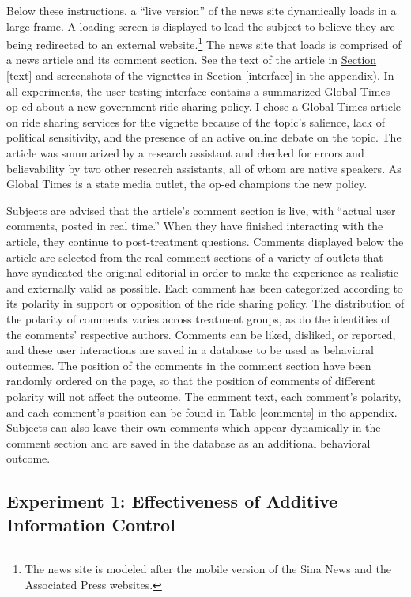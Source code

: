 \documentclass[11pt]{article}
\begin{document}
Below these instructions, a ``live version'' of the news site dynamically loads in a large frame. A loading screen is displayed to lead the subject to believe they are being redirected to an external website.\footnote{The news site is modeled after the mobile version of the Sina News and the Associated Press websites.} The news site that loads is comprised of a news article and its comment section. See the text of the article in \hyperref[text]{Section \ref*{text}} and screenshots of the vignettes in \hyperref[interface]{Section \ref*{interface}} in the appendix). In all experiments, the user testing interface contains a summarized Global Times op-ed about a new government ride sharing policy. I chose a Global Times article on ride sharing services for the vignette because of the topic's salience, lack of political sensitivity, and the presence of an active online debate on the topic. The article was summarized by a research assistant and checked for errors and believability by two other research assistants, all of whom are native speakers. As Global Times is a state media outlet, the op-ed champions the new policy.

Subjects are advised that the article's comment section is live, with ``actual user comments, posted in real time.'' When they have finished interacting with the article, they continue to post-treatment questions. Comments displayed below the article are selected from the real comment sections of a variety of outlets that have syndicated the original editorial in order to make the experience as realistic and externally valid as possible. Each comment has been categorized according to its polarity in support or opposition of the ride sharing policy. The distribution of the polarity of comments varies across treatment groups, as do the identities of the comments' respective authors. Comments can be liked, disliked, or reported, and these user interactions are saved in a database to be used as behavioral outcomes. The position of the comments in the comment section have been randomly ordered on the page, so that the position of comments of different polarity will not affect the outcome. The comment text, each comment's polarity, and each comment's position can be found in \hyperref[comments]{Table \ref*{comments}} in the appendix. Subjects can also leave their own comments which appear dynamically in the comment section and are saved in the database as an additional behavioral outcome.

\subsection{Experiment 1: Effectiveness of Additive Information Control}\label{exp:1}
\end{document}
